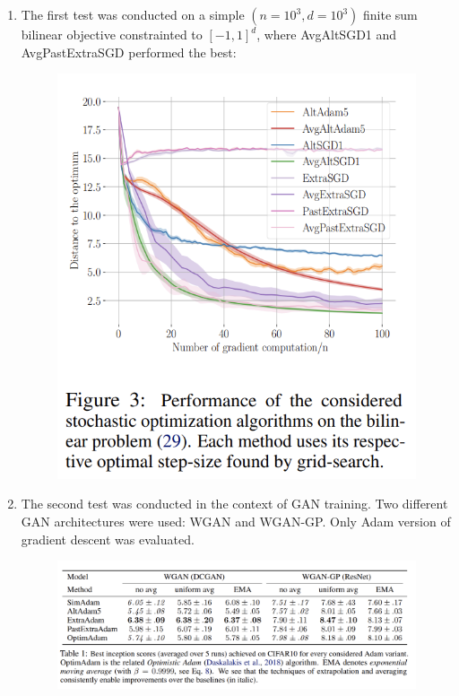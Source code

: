 \documentclass[11pt]{article}
\begin{document}
	\begin{enumerate}
		\item The first test was conducted on a simple $(n=10^3,d=10^3)$ finite sum bilinear objective constrainted to $[-1,1]^d$, where AvgAltSGD1 and AvgPastExtraSGD performed the best:
		\begin{figure}[!htb]
			\centering
			\includegraphics[scale=1]{../../pictures/pic3.png}
			\label{fig:la}
		\end{figure}
		\item The second test was conducted in the context of GAN training. Two different GAN architectures were used: WGAN and WGAN-GP. Only Adam version of gradient descent was evaluated. \\
		\begin{figure}[!htb]
			\centering
			\includegraphics[scale=1]{../../pictures/pic4.png}

\end{figure}
\end{enumerate}
\end{document}
